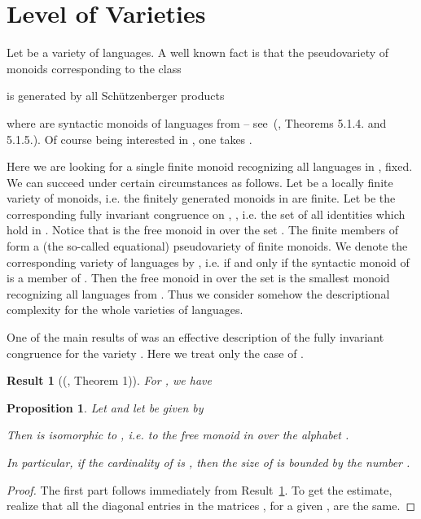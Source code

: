 \documentclass[copyright]{eptcs}
\newcounter{theorem}
\newtheorem{proposition}[theorem]{Proposition}
\newtheorem{result}[theorem]{Result}
\theoremstyle{definition}
\begin{document}
\section{Level of Varieties}

Let  be a variety of languages. A well known fact is that
the pseudovariety of monoids corresponding to the class

is generated by all Sch\"utzenberger products

where  are syntactic monoids of  languages from   
-- see~(\cite{pi-kniha}, Theorems 5.1.4. and 5.1.5.).
Of course being interested in , one takes
.

Here we are looking for a single finite monoid recognizing all languages
in ,  fixed.
We can succeed under certain circumstances as follows.
Let  be a locally finite variety of monoids, i.e. the 
finitely generated monoids in  are finite. Let  be the 
corresponding
fully invariant congruence on , , i.e.
the set of all identities which hold in  .
Notice that  is the free monoid in  over the set
. The
finite members 
of  form a
(the so-called equational) pseudovariety of finite monoids.
We denote the corresponding variety of languages by 
, i.e. 
if and only if the syntactic monoid of  is a member of 
. Then the free monoid in  over the set  is the smallest monoid recognizing
all languages from . Thus we consider somehow the descriptional
complexity for the whole varieties of languages.

One of the
main results of \cite{kp-cai} was an effective description of the fully
invariant congruence  
 for the variety
.
Here we treat only the case of .


\begin{result}[(\cite{kp-cai}, Theorem 1)]\label{res-kp}
For , we have


\end{result}

\begin{proposition} Let  and
let 
be given by

Then  is isomorphic to , i.e. to the
free monoid in  over the alphabet . 

In particular, if the cardinality of  is , then
the size of  is bounded by the number .

\end{proposition}

\begin{proof}
The first part follows immediately from Result~\ref{res-kp}.
To get the estimate,
 realize that all the diagonal entries in the matrices
, for a given ,
are the same.
\end{proof}
\end{document}

